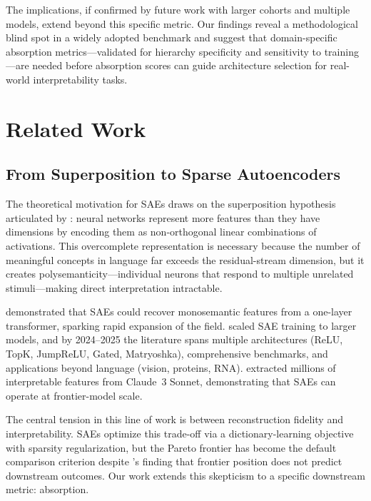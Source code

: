 \documentclass{article}
\begin{document}
The implications, if confirmed by future work with larger cohorts and multiple models, extend beyond this specific metric. Our findings reveal a methodological blind spot in a widely adopted benchmark and suggest that domain-specific absorption metrics---validated for hierarchy specificity and sensitivity to training---are needed before absorption scores can guide architecture selection for real-world interpretability tasks.

\section{Related Work}

\subsection{From Superposition to Sparse Autoencoders}

The theoretical motivation for SAEs draws on the superposition hypothesis articulated by \citet{elhage2022superposition}: neural networks represent more features than they have dimensions by encoding them as non-orthogonal linear combinations of activations. This overcomplete representation is necessary because the number of meaningful concepts in language far exceeds the residual-stream dimension, but it creates polysemanticity---individual neurons that respond to multiple unrelated stimuli---making direct interpretation intractable.

\citet{bricken2023monosemanticity} demonstrated that SAEs could recover monosemantic features from a one-layer transformer, sparking rapid expansion of the field. \citet{cunningham2023sparse} scaled SAE training to larger models, and by 2024--2025 the literature spans multiple architectures (ReLU, TopK, JumpReLU, Gated, Matryoshka), comprehensive benchmarks, and applications beyond language (vision, proteins, RNA). \citet{templeton2024scaling} extracted millions of interpretable features from Claude~3 Sonnet, demonstrating that SAEs can operate at frontier-model scale.

The central tension in this line of work is between reconstruction fidelity and interpretability. SAEs optimize this trade-off via a dictionary-learning objective with sparsity regularization, but the Pareto frontier has become the default comparison criterion despite \citeauthor{karvonen2025saebench}'s finding that frontier position does not predict downstream outcomes. Our work extends this skepticism to a specific downstream metric: absorption.
\end{document}
